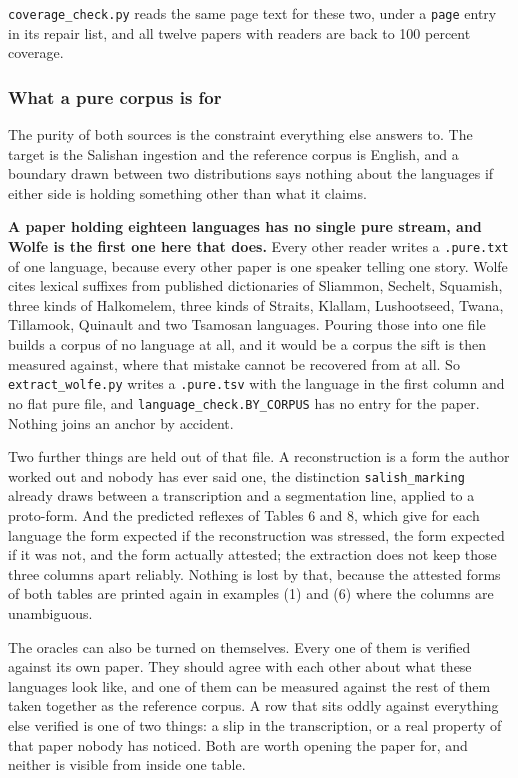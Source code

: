 \texttt{coverage\_\allowbreak{}check.\allowbreak{}py} reads the same page text for these two, under a \texttt{page} entry in its repair list, and all twelve papers with readers are back to 100 percent coverage.

\subsubsection{What a pure corpus is for}

The purity of both sources is the constraint everything else answers to. The target is the Salishan ingestion and the reference corpus is English, and a boundary drawn between two distributions says nothing about the languages if either side is holding something other than what it claims.

\textbf{A paper holding eighteen languages has no single pure stream, and Wolfe is the first one here that does.} Every other reader writes a \texttt{.\allowbreak{}pure.\allowbreak{}txt} of one language, because every other paper is one speaker telling one story. Wolfe cites lexical suffixes from published dictionaries of Sliammon, Sechelt, Squamish, three kinds of Halkomelem, three kinds of Straits, Klallam, Lushootseed, Twana, Tillamook, Quinault and two Tsamosan languages. Pouring those into one file builds a corpus of no language at all, and it would be a corpus the sift is then measured against, where that mistake cannot be recovered from at all. So \texttt{extract\_\allowbreak{}wolfe.\allowbreak{}py} writes a \texttt{.\allowbreak{}pure.\allowbreak{}tsv} with the language in the first column and no flat pure file, and \texttt{language\_\allowbreak{}check.\allowbreak{}BY\_\allowbreak{}CORPUS} has no entry for the paper. Nothing joins an anchor by accident.

Two further things are held out of that file. A reconstruction is a form the author worked out and nobody has ever said one, the distinction \texttt{salish\_\allowbreak{}marking} already draws between a transcription and a segmentation line, applied to a proto-form. And the predicted reflexes of Tables 6 and 8, which give for each language the form expected if the reconstruction was stressed, the form expected if it was not, and the form actually attested; the extraction does not keep those three columns apart reliably. Nothing is lost by that, because the attested forms of both tables are printed again in examples (1) and (6) where the columns are unambiguous.

The oracles can also be turned on themselves. Every one of them is verified against its own paper. They should agree with each other about what these languages look like, and one of them can be measured against the rest of them taken together as the reference corpus. A row that sits oddly against everything else verified is one of two things: a slip in the transcription, or a real property of that paper nobody has noticed. Both are worth opening the paper for, and neither is visible from inside one table.

